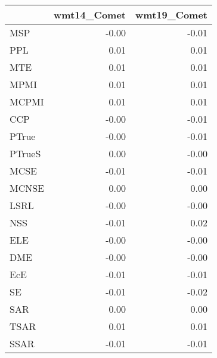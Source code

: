 \begin{tabular}{lrr}
\toprule
 & wmt14\_Comet & wmt19\_Comet \\
\midrule
MSP & -0.00 & -0.01 \\
PPL & 0.01 & 0.01 \\
MTE & 0.01 & 0.01 \\
MPMI & 0.01 & 0.01 \\
MCPMI & 0.01 & 0.01 \\
CCP & -0.00 & -0.01 \\
PTrue & -0.00 & -0.01 \\
PTrueS & 0.00 & -0.00 \\
MCSE & -0.01 & -0.01 \\
MCNSE & 0.00 & 0.00 \\
LSRL & -0.00 & -0.00 \\
NSS & -0.01 & 0.02 \\
ELE & -0.00 & -0.00 \\
DME & -0.00 & -0.00 \\
EcE & -0.01 & -0.01 \\
SE & -0.01 & -0.02 \\
SAR & 0.00 & 0.00 \\
TSAR & 0.01 & 0.01 \\
SSAR & -0.01 & -0.01 \\
\bottomrule
\end{tabular}
